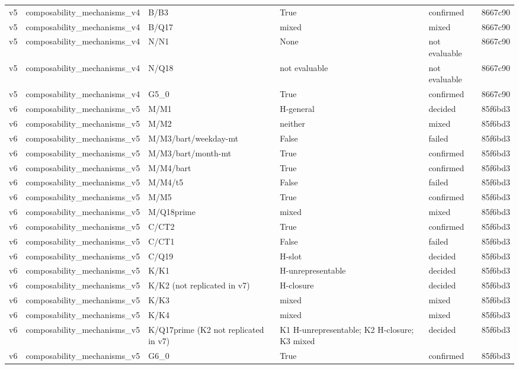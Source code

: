 \begin{longtable}{llllll}
v5 & composability\_mechanisms\_v4 & B/B3 & True & confirmed & 8667c90 \\
v5 & composability\_mechanisms\_v4 & B/Q17 & mixed & mixed & 8667c90 \\
v5 & composability\_mechanisms\_v4 & N/N1 & None & not evaluable & 8667c90 \\
v5 & composability\_mechanisms\_v4 & N/Q18 & not evaluable & not evaluable & 8667c90 \\
v5 & composability\_mechanisms\_v4 & G5\_0 & True & confirmed & 8667c90 \\
v6 & composability\_mechanisms\_v5 & M/M1 & H-general & decided & 85f6bd3 \\
v6 & composability\_mechanisms\_v5 & M/M2 & neither & mixed & 85f6bd3 \\
v6 & composability\_mechanisms\_v5 & M/M3/bart/weekday-mt & False & failed & 85f6bd3 \\
v6 & composability\_mechanisms\_v5 & M/M3/bart/month-mt & True & confirmed & 85f6bd3 \\
v6 & composability\_mechanisms\_v5 & M/M4/bart & True & confirmed & 85f6bd3 \\
v6 & composability\_mechanisms\_v5 & M/M4/t5 & False & failed & 85f6bd3 \\
v6 & composability\_mechanisms\_v5 & M/M5 & True & confirmed & 85f6bd3 \\
v6 & composability\_mechanisms\_v5 & M/Q18prime & mixed & mixed & 85f6bd3 \\
v6 & composability\_mechanisms\_v5 & C/CT2 & True & confirmed & 85f6bd3 \\
v6 & composability\_mechanisms\_v5 & C/CT1 & False & failed & 85f6bd3 \\
v6 & composability\_mechanisms\_v5 & C/Q19 & H-slot & decided & 85f6bd3 \\
v6 & composability\_mechanisms\_v5 & K/K1 & H-unrepresentable & decided & 85f6bd3 \\
v6 & composability\_mechanisms\_v5 & K/K2 (not replicated in v7) & H-closure & decided & 85f6bd3 \\
v6 & composability\_mechanisms\_v5 & K/K3 & mixed & mixed & 85f6bd3 \\
v6 & composability\_mechanisms\_v5 & K/K4 & mixed & mixed & 85f6bd3 \\
v6 & composability\_mechanisms\_v5 & K/Q17prime (K2 not replicated in v7) & K1 H-unrepresentable; K2 H-closure; K3 mixed & decided & 85f6bd3 \\
v6 & composability\_mechanisms\_v5 & G6\_0 & True & confirmed & 85f6bd3 \\

\end{longtable}
